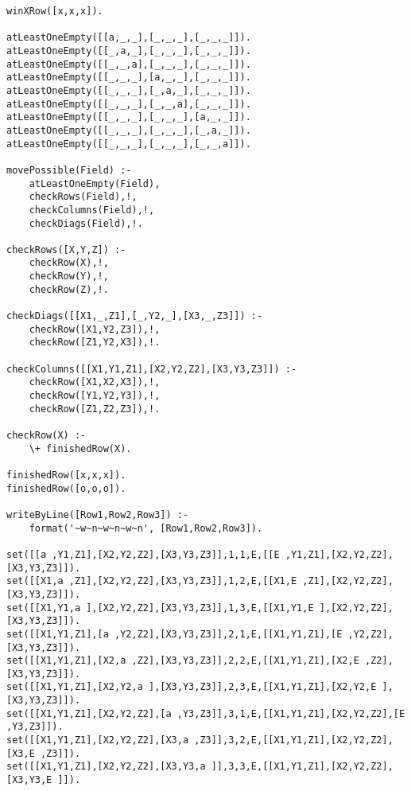 \documentclass{article}
\begin{document}
\begin{lstlisting}
winXRow([x,x,x]).

atLeastOneEmpty([[a,_,_],[_,_,_],[_,_,_]]).
atLeastOneEmpty([[_,a,_],[_,_,_],[_,_,_]]).
atLeastOneEmpty([[_,_,a],[_,_,_],[_,_,_]]).
atLeastOneEmpty([[_,_,_],[a,_,_],[_,_,_]]).
atLeastOneEmpty([[_,_,_],[_,a,_],[_,_,_]]).
atLeastOneEmpty([[_,_,_],[_,_,a],[_,_,_]]).
atLeastOneEmpty([[_,_,_],[_,_,_],[a,_,_]]).
atLeastOneEmpty([[_,_,_],[_,_,_],[_,a,_]]).
atLeastOneEmpty([[_,_,_],[_,_,_],[_,_,a]]).

movePossible(Field) :-
    atLeastOneEmpty(Field),
    checkRows(Field),!,
    checkColumns(Field),!,
    checkDiags(Field),!.

checkRows([X,Y,Z]) :-
    checkRow(X),!,
    checkRow(Y),!,
    checkRow(Z),!.

checkDiags([[X1,_,Z1],[_,Y2,_],[X3,_,Z3]]) :-
    checkRow([X1,Y2,Z3]),!,
    checkRow([Z1,Y2,X3]),!.

checkColumns([[X1,Y1,Z1],[X2,Y2,Z2],[X3,Y3,Z3]]) :-
    checkRow([X1,X2,X3]),!,
    checkRow([Y1,Y2,Y3]),!,
    checkRow([Z1,Z2,Z3]),!.

checkRow(X) :-
    \+ finishedRow(X).

finishedRow([x,x,x]).
finishedRow([o,o,o]).

writeByLine([Row1,Row2,Row3]) :-
    format('~w~n~w~n~w~n', [Row1,Row2,Row3]).

set([[a ,Y1,Z1],[X2,Y2,Z2],[X3,Y3,Z3]],1,1,E,[[E ,Y1,Z1],[X2,Y2,Z2],[X3,Y3,Z3]]).
set([[X1,a ,Z1],[X2,Y2,Z2],[X3,Y3,Z3]],1,2,E,[[X1,E ,Z1],[X2,Y2,Z2],[X3,Y3,Z3]]).
set([[X1,Y1,a ],[X2,Y2,Z2],[X3,Y3,Z3]],1,3,E,[[X1,Y1,E ],[X2,Y2,Z2],[X3,Y3,Z3]]).
set([[X1,Y1,Z1],[a ,Y2,Z2],[X3,Y3,Z3]],2,1,E,[[X1,Y1,Z1],[E ,Y2,Z2],[X3,Y3,Z3]]).
set([[X1,Y1,Z1],[X2,a ,Z2],[X3,Y3,Z3]],2,2,E,[[X1,Y1,Z1],[X2,E ,Z2],[X3,Y3,Z3]]).
set([[X1,Y1,Z1],[X2,Y2,a ],[X3,Y3,Z3]],2,3,E,[[X1,Y1,Z1],[X2,Y2,E ],[X3,Y3,Z3]]).
set([[X1,Y1,Z1],[X2,Y2,Z2],[a ,Y3,Z3]],3,1,E,[[X1,Y1,Z1],[X2,Y2,Z2],[E ,Y3,Z3]]).
set([[X1,Y1,Z1],[X2,Y2,Z2],[X3,a ,Z3]],3,2,E,[[X1,Y1,Z1],[X2,Y2,Z2],[X3,E ,Z3]]).
set([[X1,Y1,Z1],[X2,Y2,Z2],[X3,Y3,a ]],3,3,E,[[X1,Y1,Z1],[X2,Y2,Z2],[X3,Y3,E ]]).
  \end{lstlisting}
\end{document}

